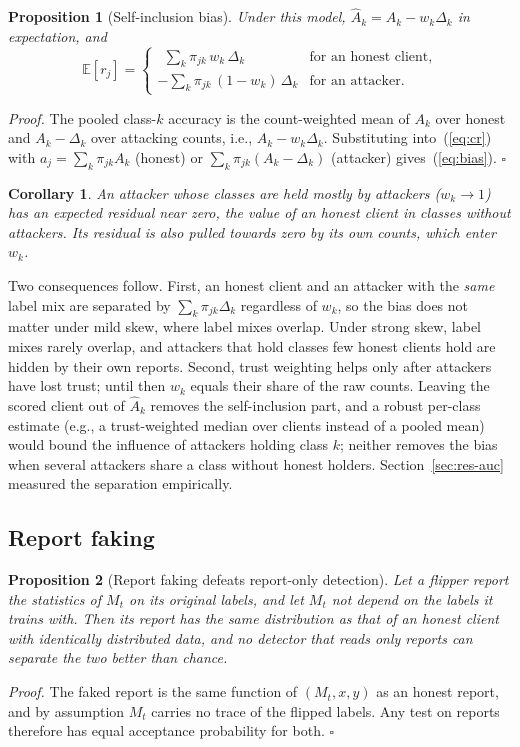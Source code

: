\documentclass[journal]{IEEEtran}
\newtheorem{proposition}{Proposition}
\newtheorem{corollary}{Corollary}
\begin{document}
\begin{proposition}[Self-inclusion bias]\label{prop:bias}
Under this model, $\hat A_k=A_k-w_k\Delta_k$ in expectation, and
\begin{equation}
\mathbb{E}[r_j]=\begin{cases}\ \ \sum_k \pi_{jk}\,w_k\,\Delta_k & \text{for an honest client,}\\ -\sum_k \pi_{jk}\,(1-w_k)\,\Delta_k & \text{for an attacker.}\end{cases}
\label{eq:bias}
\end{equation}
\end{proposition}
\emph{Proof.} The pooled class-$k$ accuracy is the count-weighted mean of $A_k$ over honest and $A_k-\Delta_k$ over attacking counts, i.e., $A_k-w_k\Delta_k$. Substituting into~(\ref{eq:cr}) with $a_j=\sum_k\pi_{jk}A_k$ (honest) or $\sum_k\pi_{jk}(A_k-\Delta_k)$ (attacker) gives~(\ref{eq:bias}). \hfill$\square$

\begin{corollary}\label{cor:bias}
An attacker whose classes are held mostly by attackers ($w_k\to1$) has an expected residual near zero, the value of an honest client in classes without attackers. Its residual is also pulled towards zero by its own counts, which enter $w_k$.
\end{corollary}

Two consequences follow. First, an honest client and an attacker with the \emph{same} label mix are separated by $\sum_k\pi_{jk}\Delta_k$ regardless of $w_k$, so the bias does not matter under mild skew, where label mixes overlap. Under strong skew, label mixes rarely overlap, and attackers that hold classes few honest clients hold are hidden by their own reports. Second, trust weighting helps only after attackers have lost trust; until then $w_k$ equals their share of the raw counts. Leaving the scored client out of $\hat A_k$ removes the self-inclusion part, and a robust per-class estimate (e.g., a trust-weighted median over clients instead of a pooled mean) would bound the influence of attackers holding class $k$; neither removes the bias when several attackers share a class without honest holders. Section~\ref{sec:res-auc} measured the separation empirically.

\subsection{Report faking}

\begin{proposition}[Report faking defeats report-only detection]\label{prop:faking}
Let a flipper report the statistics of $M_t$ on its original labels, and let $M_t$ not depend on the labels it trains with. Then its report has the same distribution as that of an honest client with identically distributed data, and no detector that reads only reports can separate the two better than chance.
\end{proposition}
\emph{Proof.} The faked report is the same function of $(M_t,x,y)$ as an honest report, and by assumption $M_t$ carries no trace of the flipped labels. Any test on reports therefore has equal acceptance probability for both. \hfill$\square$
\end{document}
